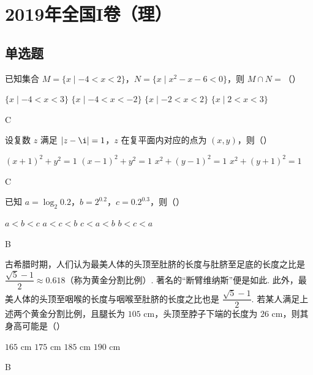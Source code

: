
\chapter{2019年全国I卷（理）}

\section{单选题}

\begin{problem}
已知集合 \(M=\{x\mid -4<x<2\}\)，\(N=\{x\mid x^2-x-6<0\}\)，则 \(M\cap N=\)（\quad）

\choices
    {\(\{x\mid -4<x<3\}\)}
    {\(\{x\mid -4<x<-2\}\)}
    {\(\{x\mid -2<x<2\}\)}
    {\(\{x\mid 2<x<3\}\)}

\begin{answer}
C
\end{answer}
\end{problem}

\begin{problem}
设复数 \(z\) 满足 \(|z-\i|=1\)，\(z\) 在复平面内对应的点为 \((x,y)\)，则（\quad）

\choices
    {\((x+1)^2+y^2=1\)}
    {\((x-1)^2+y^2=1\)}
    {\(x^2+(y-1)^2=1\)}
    {\(x^2+(y+1)^2=1\)}

\begin{answer}
C
\end{answer}
\end{problem}

\begin{problem}
已知 \(a=\log_{2}0.2\)，\(b=2^{0.2}\)，\(c=0.2^{0.3}\)，则（\quad）

\choices
    {\(a<b<c\)}
    {\(a<c<b\)}
    {\(c<a<b\)}
    {\(b<c<a\)}

\begin{answer}
B
\end{answer}
\end{problem}

\begin{problem}
古希腊时期，人们认为最美人体的头顶至肚脐的长度与肚脐至足底的长度之比是 \(\dfrac{\sqrt5-1}{2}\approx0.618\)（称为黄金分割比例）. 著名的“断臂维纳斯”便是如此. 此外，最美人体的头顶至咽喉的长度与咽喉至肚脐的长度之比也是 \(\dfrac{\sqrt5-1}{2}\). 若某人满足上述两个黄金分割比例，且腿长为 \(105\text{ cm}\)，头顶至脖子下端的长度为 \(26\text{ cm}\)，则其身高可能是（\quad）


\choices
    {\(165\text{ cm}\)}
    {\(175\text{ cm}\)}
    {\(185\text{ cm}\)}
    {\(190\text{ cm}\)}

\begin{answer}
B
\end{answer}
\end{problem}

